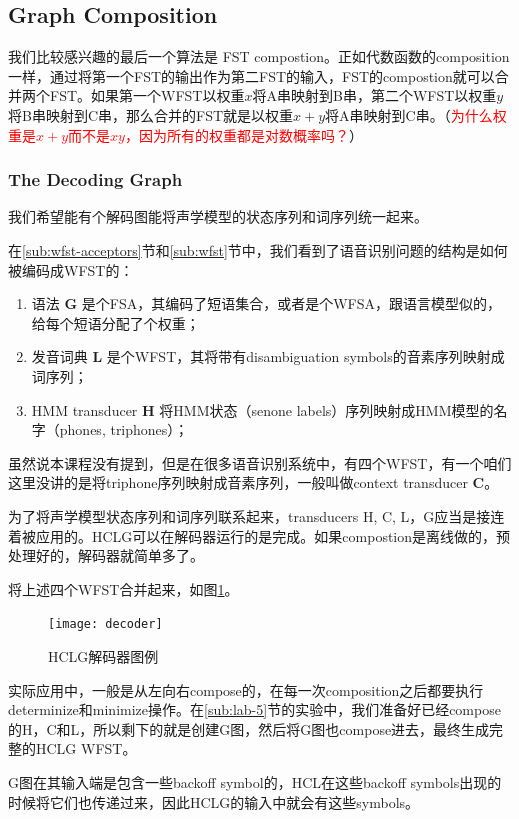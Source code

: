 {\subsection{Graph Composition}
我们比较感兴趣的最后一个算法是 FST compostion。正如代数函数的composition一样，通过将第一个FST的输出作为第二FST的输入，FST的compostion就可以合并两个FST。如果第一个WFST以权重$x$将A串映射到B串，第二个WFST以权重$y$将B串映射到C串，那么合并的FST就是以权重$x+y$将A串映射到C串。（\textcolor{red}{为什么权重是$x+y$而不是$xy$，因为所有的权重都是对数概率吗？}）

\subsubsection{The Decoding Graph}
我们希望能有个解码图能将声学模型的状态序列和词序列统一起来。

在\ref{sub:wfst-acceptors}节和\ref{sub:wfst}节中，我们看到了语音识别问题的结构是如何被编码成WFST的：
\begin{enumerate}
  \item 语法 {\bf G} 是个FSA，其编码了短语集合，或者是个WFSA，跟语言模型似的，给每个短语分配了个权重；
  \item 发音词典 {\bf L} 是个WFST，其将带有disambiguation symbols的音素序列映射成词序列；
  \item HMM transducer {\bf H} 将HMM状态（senone labels）序列映射成HMM模型的名字（phones, triphones）；
\end{enumerate}

虽然说本课程没有提到，但是在很多语音识别系统中，有四个WFST，有一个咱们这里没讲的是将triphone序列映射成音素序列，一般叫做context transducer {\bf C}。

为了将声学模型状态序列和词序列联系起来，transducers H, C, L，G应当是接连着被应用的。HCLG可以在解码器运行的是完成。如果compostion是离线做的，预处理好的，解码器就简单多了。

将上述四个WFST合并起来，如图\ref{fig:decoder}。
\begin{figure}[htbp]
  \centering
  \texttt{[image: decoder]}
  \caption{HCLG解码器图例 \label{fig:decoder}}
\end{figure}

实际应用中，一般是从左向右compose的，在每一次composition之后都要执行determinize和minimize操作。在\ref{sub:lab-5}节的实验中，我们准备好已经compose的H，C和L，所以剩下的就是创建G图，然后将G图也compose进去，最终生成完整的HCLG WFST。

G图在其输入端是包含一些backoff symbol的，HCL在这些backoff symbols出现的时候将它们也传递过来，因此HCLG的输入中就会有这些symbols。

}
